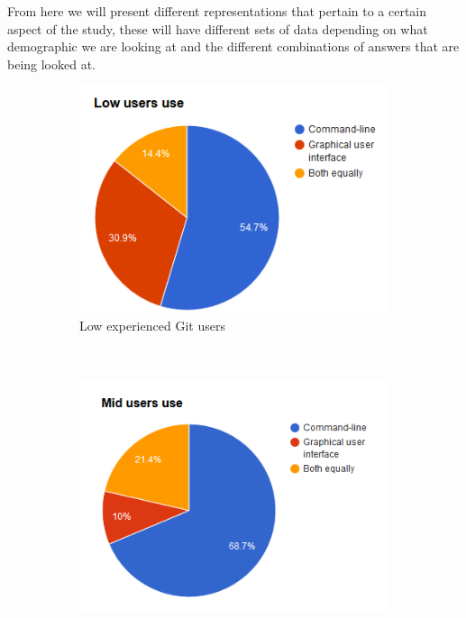 \documentclass[a4paper,oneside]{bth} %
\begin{document}
			From here we will present different representations that pertain to a certain aspect of the study, these will have different sets of data depending on what demographic we are looking at and the different combinations of answers that are being looked at.
			\begin{figure}[H]
					\centering
					\begin{subfigure}[b]{0.315\textwidth}
						\includegraphics[width=\textwidth]{graphs/low-users-use.png}
						\caption{Low experienced Git users}
						\label{fig:Low users use}
					\end{subfigure}
					~
					\begin{subfigure}[b]{0.315\textwidth}
						\includegraphics[width=\textwidth]{graphs/mid-users-use.png}

\end{subfigure}
\end{figure}
\end{document}
